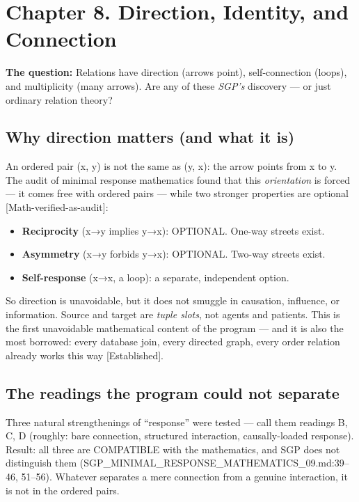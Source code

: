 \documentclass[
  11pt,
]{book}
\providecommand{\tightlist}{%
  \setlength{\itemsep}{0pt}\setlength{\parskip}{0pt}}
\begin{document}
\newpage

\chapter{Chapter 8. Direction, Identity, and
Connection}\label{chapter-8.-direction-identity-and-connection}

\textbf{The question:} Relations have direction (arrows point),
self-connection (loops), and multiplicity (many arrows). Are any of
these \emph{SGP's} discovery --- or just ordinary relation theory?

\section{Why direction matters (and what it
is)}\label{why-direction-matters-and-what-it-is}

An ordered pair (x, y) is not the same as (y, x): the arrow points from
x to y. The audit of minimal response mathematics found that this
\emph{orientation} is forced --- it comes free with ordered pairs ---
while two stronger properties are optional {[}Math-verified-as-audit{]}:

\begin{itemize}
\tightlist
\item
  \textbf{Reciprocity} (x→y implies y→x): OPTIONAL. One-way streets
  exist.
\item
  \textbf{Asymmetry} (x→y forbids y→x): OPTIONAL. Two-way streets exist.
\item
  \textbf{Self-response} (x→x, a loop): a separate, independent option.
\end{itemize}

So direction is unavoidable, but it does not smuggle in causation,
influence, or information. Source and target are \emph{tuple slots}, not
agents and patients. This is the first unavoidable mathematical content
of the program --- and it is also the most borrowed: every database
join, every directed graph, every order relation already works this way
{[}Established{]}.

\section{The readings the program could not
separate}\label{the-readings-the-program-could-not-separate}

Three natural strengthenings of ``response'' were tested --- call them
readings B, C, D (roughly: bare connection, structured interaction,
causally-loaded response). Result: all three are COMPATIBLE with the
mathematics, and SGP does not distinguish them
(SGP\_MINIMAL\_RESPONSE\_MATHEMATICS\_09.md:39--46, 51--56). Whatever
separates a mere connection from a genuine interaction, it is not in the
ordered pairs.
\end{document}
